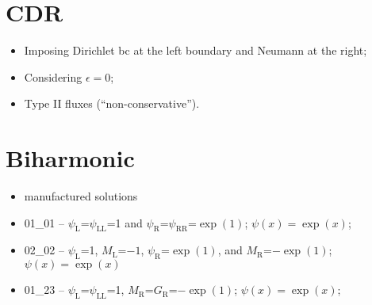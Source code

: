 \documentclass[11pt,a4paper]{article}
\begin{document}
\section{CDR}
\begin{itemize}
\item Imposing Dirichlet bc at the left boundary and Neumann at the right;
\item Considering $\epsilon=0$;
\item Type II fluxes (``non-conservative'').
\end{itemize}













\pagebreak

\section{Biharmonic}

\begin{itemize}
\item manufactured solutions
\item 01\_01 -- $\psi_\text{L}$=$\psi_\text{LL}$=1 and $\psi_\text{R}$=$\psi_\text{RR}$=$\exp(1)$; $\psi(x)=\exp(x)$;
\item 02\_02 -- $\psi_\text{L}$=1, $M_\text{L}$=$-1$, $\psi_\text{R}$=$\exp(1)$, and $M_\text{R}$=$-\exp(1)$; $\psi(x)=\exp(x)$
\item 01\_23 -- $\psi_\text{L}$=$\psi_\text{LL}$=1, $M_\text{R}$=$G_\text{R}$=$-\exp(1)$; $\psi(x)=\exp(x)$;
\end{itemize}




\end{document}
